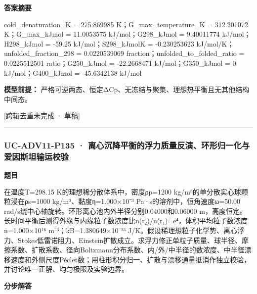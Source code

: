 \documentclass[UTF8,11pt,a4paper]{ctexart}
\begin{document}
\noindent\textbf{答案摘要}\par
cold\_denaturation\_K = 275.869985 K；G\_max\_temperature\_K = 312.201072 K；G\_max\_kJmol = 11.0053575 kJ/mol；G298\_kJmol = 9.40011774 kJ/mol；H298\_kJmol = -59.25 kJ/mol；S298\_kJmolK = -0.230253623 kJ/mol/K；unfolded\_fraction\_298 = 0.0220539069 fraction；unfolded\_to\_folded\_ratio = 0.0225512501 ratio；G250\_kJmol = -22.2668471 kJ/mol；G350\_kJmol = 0 kJ/mol；G400\_kJmol = -45.6342138 kJ/mol\par
\noindent\textbf{模型前提：}
严格可逆两态、恒定ΔCp、无冻结与聚集、理想热平衡且无其他结构中间态。\par
\noindent\textcolor{red!65!black}{[跨辑去重未完成 · 草稿]} \par
\medskip\hrule\medskip
{}
\subsubsection*{UC-ADV11-P135 · 离心沉降平衡的浮力质量反演、环形归一化与爱因斯坦输运校验}
\noindent\textbf{题目}\par
在温度T=298.15 K的理想稀分散体系中，密度ρp=1200 kg/m³的单分散实心球颗粒浸在ρs=1000 kg/m³、黏度η=1.000×10⁻³ Pa·s的溶剂中，恒角速度ω=50.00 rad/s绕中心轴旋转。环形离心池内外半径分别0.04000和0.06000 m，高度恒定。长时间平衡后测得外缘与内缘粒子数浓度比n(r₂)/n(r₁)=e⁴，体积平均粒子数浓度n̄=1.000×10¹⁶ m⁻³；kB=1.380649×10⁻²³ J/K。假设稀理想粒子化学势、离心浮力、Stokes低雷诺阻力、Einstein扩散成立。求浮力修正单粒子质量、球半径、摩擦系数、扩散系数、径向Boltzmann分布系数、内/外/中半径的数浓度、中半径漂移速度和外侧尺度Péclet数；用柱形积分归一、扩散与漂移通量抵消作独立校验，并讨论唯一正解、均匀极限及实验边界。\par
\medskip\noindent\textbf{分步解答}
\end{document}
